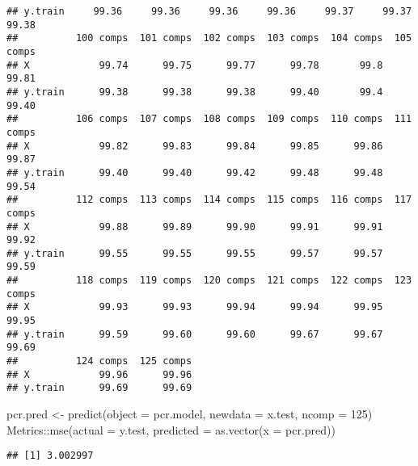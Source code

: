 \documentclass[
]{article}
\newenvironment{Shaded}{\begin{snugshade}}{\end{snugshade}}
\newcommand{\AttributeTok}[1]{\textcolor[rgb]{0.77,0.63,0.00}{#1}}
\newcommand{\CommentTok}[1]{\textcolor[rgb]{0.56,0.35,0.01}{\textit{#1}}}
\newcommand{\ConstantTok}[1]{\textcolor[rgb]{0.00,0.00,0.00}{#1}}
\newcommand{\DecValTok}[1]{\textcolor[rgb]{0.00,0.00,0.81}{#1}}
\newcommand{\FunctionTok}[1]{\textcolor[rgb]{0.00,0.00,0.00}{#1}}
\newcommand{\NormalTok}[1]{#1}
\newcommand{\OtherTok}[1]{\textcolor[rgb]{0.56,0.35,0.01}{#1}}
\newcommand{\SpecialCharTok}[1]{\textcolor[rgb]{0.00,0.00,0.00}{#1}}
\begin{document}
\begin{verbatim}
## y.train     99.36     99.36     99.36     99.36     99.37     99.37     99.38
##          100 comps  101 comps  102 comps  103 comps  104 comps  105 comps
## X            99.74      99.75      99.77      99.78       99.8      99.81
## y.train      99.38      99.38      99.38      99.40       99.4      99.40
##          106 comps  107 comps  108 comps  109 comps  110 comps  111 comps
## X            99.82      99.83      99.84      99.85      99.86      99.87
## y.train      99.40      99.40      99.42      99.48      99.48      99.54
##          112 comps  113 comps  114 comps  115 comps  116 comps  117 comps
## X            99.88      99.89      99.90      99.91      99.91      99.92
## y.train      99.55      99.55      99.55      99.57      99.57      99.59
##          118 comps  119 comps  120 comps  121 comps  122 comps  123 comps
## X            99.93      99.93      99.94      99.94      99.95      99.95
## y.train      99.59      99.60      99.60      99.67      99.67      99.69
##          124 comps  125 comps
## X            99.96      99.96
## y.train      99.69      99.69
\end{verbatim}

\begin{Shaded}
\begin{Highlighting}[]
\NormalTok{pcr.pred }\OtherTok{\textless{}{-}} \FunctionTok{predict}\NormalTok{(}\AttributeTok{object =}\NormalTok{ pcr.model, }\AttributeTok{newdata =}\NormalTok{ x.test, }\AttributeTok{ncomp =} \DecValTok{125}\NormalTok{)}
\NormalTok{Metrics}\SpecialCharTok{::}\FunctionTok{mse}\NormalTok{(}\AttributeTok{actual =}\NormalTok{ y.test, }\AttributeTok{predicted =} \FunctionTok{as.vector}\NormalTok{(}\AttributeTok{x =}\NormalTok{ pcr.pred))}
\end{Highlighting}
\end{Shaded}

\begin{verbatim}
## [1] 3.002997
\end{verbatim}

\begin{Shaded}
\end{Shaded}
\end{document}
